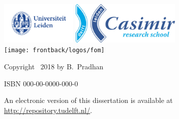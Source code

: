 \begin{titlepage}
\vfill
\begin{center}
    \includegraphics[height=0.8in]{frontback/logos/leiden}
    \hspace{2em}
    \includegraphics[height=0.8in]{frontback/logos/casimir} \\
    \texttt{[image: frontback/logos/fom]}
\end{center}
\vfill

\vspace{4\bigskipamount}

\noindent Copyright \textcopyright\ 2018 by B.~Pradhan


\medskip
\noindent ISBN 000-00-0000-000-0

\medskip
\noindent An electronic version of this dissertation is available at \\
\url{http://repository.tudelft.nl/}.

\end{titlepage}

